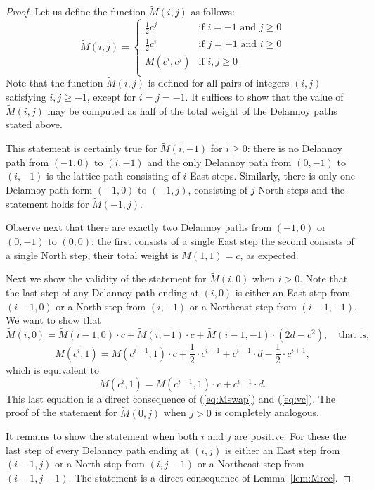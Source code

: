 \documentclass[reqno,12pt]{amsart}
\numberwithin{equation}{section}
\newcommand{\0}{\widehat{0}}
\newcommand{\1}{\widehat{1}}
\newcommand{\2}{\widehat{2}}
\begin{document}
\begin{proof}
  Let us define the function $\widetilde{M}(i,j)$ as follows:
  $$
  \widetilde{M}(i,j)=
  \begin{cases}
    \frac{1}{2} c^j & \mbox{if $i=-1$ and $j\geq 0$}\\
    \frac{1}{2} c^i & \mbox{if $j=-1$ and $i\geq 0$}\\
M(c^i,c^j) & \mbox{if $i,j\geq 0$}\\
  \end{cases}  
  $$
Note that the function $\widetilde{M}(i,j)$ is defined for all pairs of
integers $(i,j)$ satisfying $i,j\geq -1$, except for $i=j=-1$. It
suffices to show that the value of $\widetilde{M}(i,j)$ may be computed
as half of the total weight of the Delannoy paths stated above.

This statement is certainly true for $\widetilde{M}(i,-1)$ for $i\geq
0$: there is no Delannoy path from $(-1,0)$ to $(i,-1)$ and the only
Delannoy path from $(0,-1)$ to $(i,-1)$ is the lattice path consisting
of $i$ East steps. Similarly, there is only one Delannoy path form
$(-1,0)$ to $(-1,j)$, consisting of $j$ North steps and the statement
holds for $\widetilde{M}(-1,j)$.

Observe next that there are exactly two Delannoy paths from $(-1,0)$ or
$(0,-1)$ to $(0,0)$: the first consists of a single East step the second
consists of a single North step, their total weight is $M(1,1)=c$, as expected.

Next we show the validity of the statement for
$\widetilde{M}(i,0)$ when $i>0$. Note that the last step of any Delannoy path
ending at $(i,0)$ is either an East step from $(i-1,0)$  or a North step
from $(i,-1)$ or a Northeast step from $(i-1,-1)$. We want to show that
$$
\widetilde{M}(i,0)
=\widetilde{M}(i-1,0)\cdot c+\widetilde{M}(i,-1)\cdot c
+\widetilde{M}(i-1,-1)\cdot (2d-c^2),\quad\mbox{that
  is,}  
$$
$$
M(c^i,1)=M(c^{i-1},1)\cdot c+\frac{1}{2}\cdot c^{i+1}
+c^{i-1}\cdot d-\frac{1}{2}\cdot c^{i+1},
$$
which is equivalent to
$$
M(c^i,1)=M(c^{i-1},1)\cdot c+c^{i-1}\cdot d.
$$
This last equation is a direct consequence of (\ref{eq:Mswap}) and
(\ref{eq:vc}).  The proof of the statement for $\widetilde{M}(0,j)$ when
$j>0$ is completely analogous.

It remains to show the statement when both $i$ and $j$ are positive. For
these the last step of every Delannoy path ending at $(i,j)$ is either
an East step from $(i-1,j)$ or a North step from $(i,j-1)$ or a
Northeast step from $(i-1,j-1)$. The statement is a direct consequence
of Lemma~\ref{lem:Mrec}.   
\end{proof}
\end{document}

